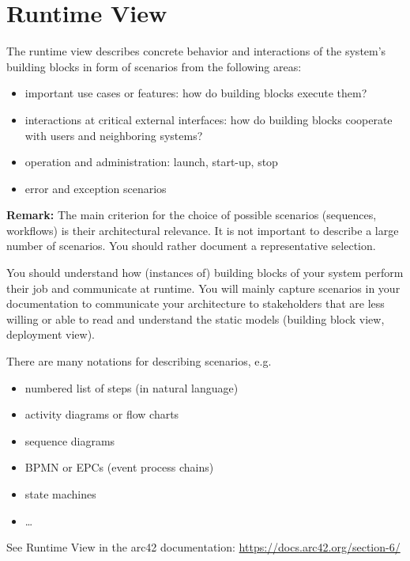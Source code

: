 \section{Runtime View}

The runtime view describes concrete behavior and interactions of the system’s building blocks in form of scenarios from the following areas:
\begin{itemize}
  \item important use cases or features: how do building blocks execute them?
  \item interactions at critical external interfaces: how do building blocks cooperate with users and neighboring systems?
  \item operation and administration: launch, start-up, stop
  \item error and exception scenarios
\end{itemize}

\noindent\textbf{Remark:} The main criterion for the choice of possible scenarios (sequences, workflows) is their architectural relevance. It is not important to describe a large number of scenarios. You should rather document a representative selection.

You should understand how (instances of) building blocks of your system perform their job and communicate at runtime. You will mainly capture scenarios in your documentation to communicate your architecture to stakeholders that are less willing or able to read and understand the static models (building block view, deployment view).

There are many notations for describing scenarios, e.g.
\begin{itemize}
  \item numbered list of steps (in natural language)
  \item activity diagrams or flow charts
  \item sequence diagrams
  \item BPMN or EPCs (event process chains)
  \item state machines
  \item \dots
\end{itemize}

See Runtime View in the arc42 documentation:
\href{https://docs.arc42.org/section-6/}{https://docs.arc42.org/section-6/}


